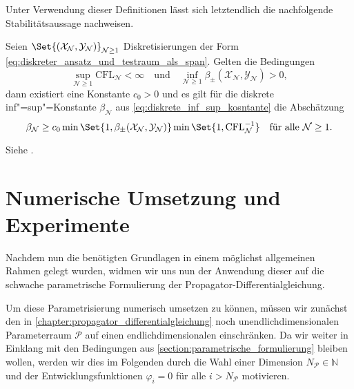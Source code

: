 \documentclass[../main.tex]{subfiles}
\begin{document}
Unter Verwendung dieser Definitionen lässt sich letztendlich die nachfolgende Stabilitätsaussage nachweisen.

\begin{Satz}
    Seien $\Set{(\mathcal X_{\mathcal N}, \mathcal Y_{\mathcal N})}_{\mathcal N \geq 1}$ Diskretisierungen der Form \cref{eq:diskreter_ansatz_und_testraum_als_span}.
    Gelten die Bedingungen
    \begin{equation}
        \sup_{\mathcal N \geq 1} \mathrm{CFL}_{\mathcal N} < \infty
        \quad \text{und} \quad
        \inf_{\mathcal N \geq 1} \beta_{\pm}(\mathcal X_{\mathcal N}, \mathcal Y_{\mathcal N}) > 0,
    \end{equation}
    dann existiert eine Konstante $c_{0} > 0$ und es gilt für die diskrete inf"=sup"=Konstante $\beta_{\mathcal N}$ aus \cref{eq:diskrete_inf_sup_kosntante} die Abschätzung
    \begin{equation}
        \beta_{\mathcal N} \geq c_{0} \min\Set{1, \beta_{\pm}(\mathcal X_{\mathcal N}, \mathcal Y_{\mathcal N})} \min\Set{1, \mathrm{CFL}_{\mathcal N}^{-1}} \quad \fa \mathcal N \geq 1.
    \end{equation}

    \begin{Beweis}
        Siehe \cite[Subsection 5.2.2]{Andreev:2012ep}.
    \end{Beweis}
\end{Satz}


\section{Numerische Umsetzung und Experimente} %
\label{section:galerkin_numerische_umsetzung_und_experimente}

Nachdem nun die benötigten Grundlagen in einem möglichst allgemeinen Rahmen gelegt wurden, widmen wir uns nun der Anwendung dieser auf die schwache parametrische Formulierung der Propagator-Differentialgleichung.

Um diese Parametrisierung numerisch umsetzen zu können, müssen wir zunächst den in \cref{chapter:propagator_differentialgleichung} noch unendlichdimensionalen Parameterraum $\mathcal P$ auf einen endlichdimensionalen einschränken.
Da wir weiter in Einklang mit den Bedingungen aus \cref{section:parametrische_formulierung} bleiben wollen, werden wir dies im Folgenden durch die Wahl einer Dimension $N_{\mathcal P} \in \mathbb{N}$ und der Entwicklungsfunktionen $\varphi_{i} = 0$ für alle $i > N_{\mathcal P}$ motivieren.
\end{document}
